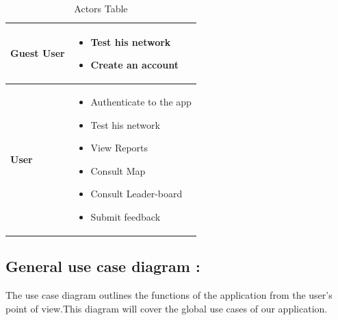 \begin{table}[H]

  
   \begin{tabular}{|p{}|p{}|}
   \hline
     
        \begin{center}
            \textbf{Guest User}
        \end{center} & 
        \begin{itemize}
            \renewcommand\labelitemi{\textbf{\Huge .}}

            \item Test his network
            \item Create an account

        \end{itemize}  \\   \hline
        \begin{center}
            \textbf{User}
        \end{center} & 
        \begin{itemize}
            \renewcommand\labelitemi{\textbf{\Huge .}}

            \item Authenticate to the app
            \item Test his network
            \item View Reports
            \item Consult Map
            \item Consult Leader-board
            \item Submit feedback 

        \end{itemize}  \\   \hline



        
\end{tabular}
     \caption{Actors Table}
    \label{tab:my_label}
     \setlength{\abovecaptionskip}{0.25cm}
\end{table}

\newpage 

\subsection{General use case diagram : }

The use case diagram outlines the functions of the application from the user's point of view.This diagram will cover the global use cases of our application.


